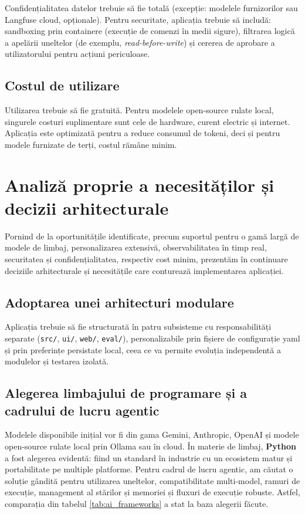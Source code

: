 \documentclass[12pt, a4paper, oneside, romanian]{teza-upb}
\begin{document}
  Confidențialitatea datelor trebuie să fie totală (excepție: modelele furnizorilor sau Langfuse cloud, opționale). Pentru securitate, aplicația trebuie să includă: sandboxing prin containere (execuție de comenzi în medii sigure), filtrarea logică a apelării uneltelor (de exemplu, \textit{read-before-write}) și cererea de aprobare a utilizatorului pentru acțiuni periculoase.

  \subsection{Costul de utilizare}

  Utilizarea trebuie să fie gratuită. Pentru modelele open-source rulate local, singurele costuri suplimentare sunt cele de hardware, curent electric și internet. Aplicația este optimizată pentru a reduce consumul de tokeni, deci și pentru modele furnizate de terți, costul rămâne minim.

  \section{Analiză proprie a necesităților și decizii arhitecturale}

  Pornind de la oportunitățile identificate, precum suportul pentru o gamă largă de modele de limbaj, personalizarea extensivă, observabilitatea în timp real,
  securitatea și confidențialitatea, respectiv cost minim, prezentăm în continuare
  deciziile arhitecturale și necesitățile care conturează implementarea aplicației.

  \subsection{Adoptarea unei arhitecturi modulare}

  Aplicația trebuie să fie structurată în patru subsisteme cu responsabilități separate (\texttt{src/},
  \texttt{ui/}, \texttt{web/}, \texttt{eval/}), personalizabile prin fișiere de configurație \ac{yaml} și
  prin preferințe persistate local, ceea ce va permite evoluția independentă a modulelor și testarea
  izolată.

  \subsection{Alegerea limbajului de programare și a cadrului de lucru agentic}

  Modelele disponibile inițial vor fi din gama Gemini, Anthropic, OpenAI și modele open-source rulate local prin Ollama sau în cloud. În materie de limbaj, \textbf{Python}~\cite{web_python} a fost alegerea evidentă: fiind un standard în industrie cu un ecosistem matur și portabilitate pe multiple platforme. Pentru cadrul de lucru agentic, am căutat o soluție gândită pentru utilizarea uneltelor, compatibilitate multi-model, ramuri de execuție, management al stărilor și memoriei și fluxuri de execuție robuste. Astfel, comparația din tabelul \ref{tab:ai_frameworks} a stat la baza alegerii făcute.
\end{document}
